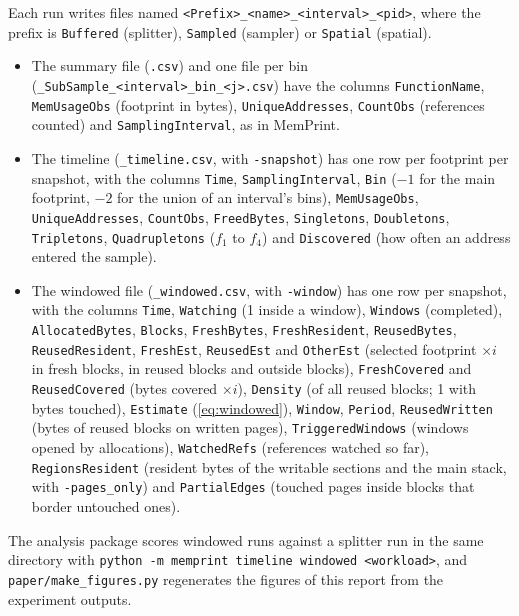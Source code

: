 \documentclass[11pt]{article}
\newcommand{\memprint}{MemPrint}
\newcommand{\knob}[1]{\texttt{-#1}}
\begin{document}
Each run writes files named \texttt{<Prefix>\_<name>\_<interval>\_<pid>}, where the prefix is \texttt{Buffered} (splitter), \texttt{Sampled} (sampler) or \texttt{Spatial} (spatial).
\begin{itemize}
\item The summary file (\texttt{.csv}) and one file per bin (\texttt{\_SubSample\_<interval>\_bin\_<j>.csv}) have the columns \texttt{FunctionName}, \texttt{MemUsageObs} (footprint in bytes), \texttt{UniqueAddresses}, \texttt{CountObs} (references counted) and \texttt{SamplingInterval}, as in \memprint{}.
\item The timeline (\texttt{\_timeline.csv}, with \knob{snapshot}) has one row per footprint per snapshot, with the columns \texttt{Time}, \texttt{SamplingInterval}, \texttt{Bin} ($-1$ for the main footprint, $-2$ for the union of an interval's bins), \texttt{MemUsageObs}, \texttt{UniqueAddresses}, \texttt{CountObs}, \texttt{FreedBytes}, \texttt{Singletons}, \texttt{Doubletons}, \texttt{Tripletons}, \texttt{Quadrupletons} ($f_1$ to $f_4$) and \texttt{Discovered} (how often an address entered the sample).
\item The windowed file (\texttt{\_windowed.csv}, with \knob{window}) has one row per snapshot, with the columns \texttt{Time}, \texttt{Watching} (1 inside a window), \texttt{Windows} (completed), \texttt{AllocatedBytes}, \texttt{Blocks}, \texttt{FreshBytes}, \texttt{FreshResident}, \texttt{ReusedBytes}, \texttt{ReusedResident}, \texttt{FreshEst}, \texttt{ReusedEst} and \texttt{OtherEst} (selected footprint $\times i$ in fresh blocks, in reused blocks and outside blocks), \texttt{FreshCovered} and \texttt{ReusedCovered} (bytes covered $\times i$), \texttt{Density} (of all reused blocks; 1 with bytes touched), \texttt{Estimate} (\eqref{eq:windowed}), \texttt{Window}, \texttt{Period}, \texttt{ReusedWritten} (bytes of reused blocks on written pages), \texttt{TriggeredWindows} (windows opened by allocations), \texttt{WatchedRefs} (references watched so far), \texttt{RegionsResident} (resident bytes of the writable sections and the main stack, with \knob{pages\_only}) and \texttt{PartialEdges} (touched pages inside blocks that border untouched ones).
\end{itemize}
The analysis package scores windowed runs against a splitter run in the same directory with \texttt{python -m memprint timeline windowed <workload>}, and \texttt{paper/make\_figures.py} regenerates the figures of this report from the experiment outputs.
\end{document}
